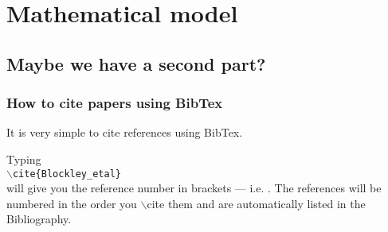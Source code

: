 \chapter{Mathematical model}\label{Mathematical model}

\section{Maybe we have a second part?}



\subsection{How to cite papers using BibTex}

It is very simple to cite references using BibTex.

Typing\\ {\tt $\backslash$cite\{Blockley\_etal\}}\\ will give you the reference number in brackets --- i.e. \cite{Blockley_etal}.
The references will be numbered in the order you $\backslash$cite them and are automatically listed 	in the Bibliography.
